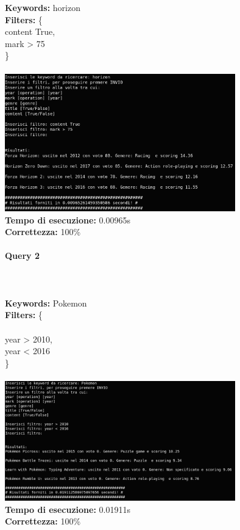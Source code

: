 \documentclass[12pt]{article}
\begin{document}
\noindent \textbf{Keywords: } horizon \\
\textbf{Filters: } \{ \\ 
	\indent content True, \\
	\indent mark > 75 \\
\} \\\\
 	
\noindent \includegraphics[width=100mm]{Immagini/Image1.png} \\
\textbf{Tempo di esecuzione:} 0.00965s \\
\textbf{Correttezza:} 100\% \pagebreak

\paragraph{\LARGE{Query 2}} ~ \\ \\

\noindent \textbf{Keywords: } Pokemon \\
\textbf{Filters: } \{ \\ \\
\indent year > 2010, \\
\indent year < 2016 \\
\} \\\\

\noindent \includegraphics[width=100mm]{Immagini/Image2.png} \\
\textbf{Tempo di esecuzione:} 0.01911s \\
\textbf{Correttezza:} 100\% \pagebreak
\end{document}
